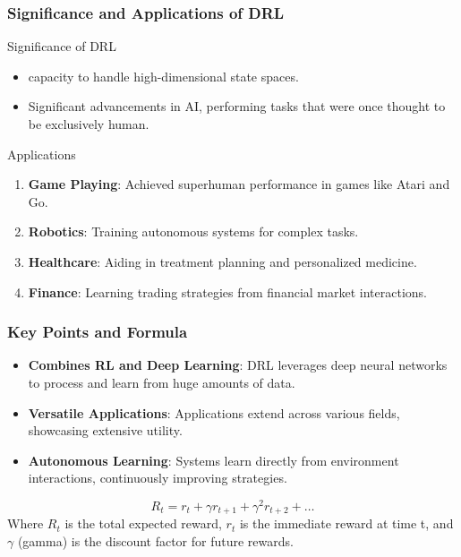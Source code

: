 \documentclass{beamer}
\begin{document}
\begin{frame}[fragile]
    \frametitle{Significance and Applications of DRL}
    \begin{block}{Significance of DRL}
        \begin{itemize}
            \item capacity to handle high-dimensional state spaces.
            \item Significant advancements in AI, performing tasks that were once thought to be exclusively human.
        \end{itemize}
    \end{block}
    
    \begin{block}{Applications}
        \begin{enumerate}
            \item \textbf{Game Playing}: Achieved superhuman performance in games like Atari and Go.
            \item \textbf{Robotics}: Training autonomous systems for complex tasks.
            \item \textbf{Healthcare}: Aiding in treatment planning and personalized medicine.
            \item \textbf{Finance}: Learning trading strategies from financial market interactions.
        \end{enumerate}
    \end{block}
\end{frame}

\begin{frame}[fragile]
    \frametitle{Key Points and Formula}
    \begin{itemize}
        \item \textbf{Combines RL and Deep Learning}: DRL leverages deep neural networks to process and learn from huge amounts of data.
        \item \textbf{Versatile Applications}: Applications extend across various fields, showcasing extensive utility.
        \item \textbf{Autonomous Learning}: Systems learn directly from environment interactions, continuously improving strategies.
    \end{itemize}
    
    \begin{equation}
        R_t = r_t + \gamma r_{t+1} + \gamma^2 r_{t+2} + \ldots
    \end{equation}
    Where \( R_t \) is the total expected reward, \( r_t \) is the immediate reward at time t, and \( \gamma \) (gamma) is the discount factor for future rewards.
\end{frame}
\end{document}
